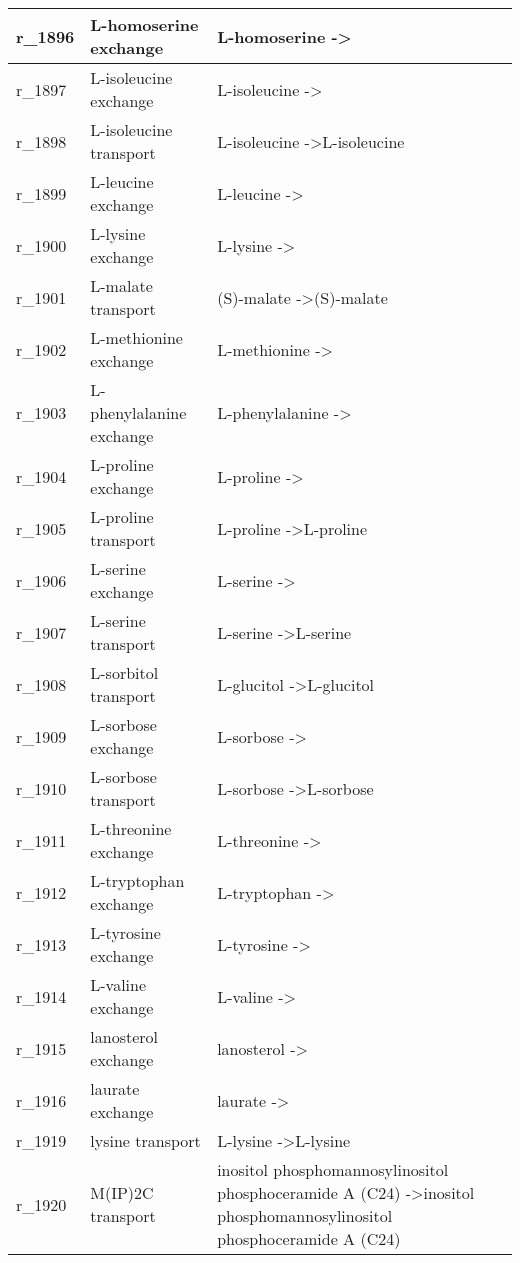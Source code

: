 \begin{landscape}
{\begin{longtable}{|l|p{7cm}|p{15cm}|}
r\_1896 & L-homoserine exchange & L-homoserine  -\textgreater{} \\ \hline
r\_1897 & L-isoleucine exchange & L-isoleucine  -\textgreater{} \\ \hline
r\_1898 & L-isoleucine transport & L-isoleucine  -\textgreater L-isoleucine \\ \hline
r\_1899 & L-leucine exchange & L-leucine  -\textgreater{} \\ \hline
r\_1900 & L-lysine exchange & L-lysine  -\textgreater{} \\ \hline
r\_1901 & L-malate transport & (S)-malate  -\textgreater (S)-malate \\ \hline
r\_1902 & L-methionine exchange & L-methionine  -\textgreater{} \\ \hline
r\_1903 & L-phenylalanine exchange & L-phenylalanine  -\textgreater{} \\ \hline
r\_1904 & L-proline exchange & L-proline  -\textgreater{} \\ \hline
r\_1905 & L-proline transport & L-proline  -\textgreater L-proline \\ \hline
r\_1906 & L-serine exchange & L-serine  -\textgreater{} \\ \hline
r\_1907 & L-serine transport & L-serine  -\textgreater L-serine \\ \hline
r\_1908 & L-sorbitol transport & L-glucitol  -\textgreater L-glucitol \\ \hline
r\_1909 & L-sorbose exchange & L-sorbose  -\textgreater{} \\ \hline
r\_1910 & L-sorbose transport & L-sorbose  -\textgreater L-sorbose \\ \hline
r\_1911 & L-threonine exchange & L-threonine  -\textgreater{} \\ \hline
r\_1912 & L-tryptophan exchange & L-tryptophan  -\textgreater{} \\ \hline
r\_1913 & L-tyrosine exchange & L-tyrosine  -\textgreater{} \\ \hline
r\_1914 & L-valine exchange & L-valine  -\textgreater{} \\ \hline
r\_1915 & lanosterol exchange & lanosterol  -\textgreater{} \\ \hline
r\_1916 & laurate exchange & laurate  -\textgreater{} \\ \hline
r\_1919 & lysine transport & L-lysine  -\textgreater L-lysine \\ \hline
r\_1920 & M(IP)2C transport & inositol phosphomannosylinositol phosphoceramide A (C24)  -\textgreater inositol phosphomannosylinositol phosphoceramide A (C24) \\ \hline

\end{longtable}}
\end{landscape}

